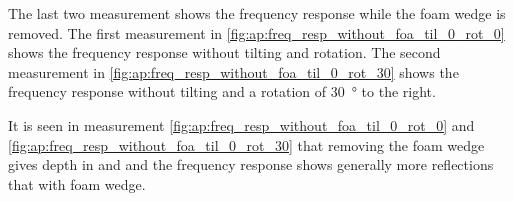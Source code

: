 The last two measurement shows the frequency response while the foam wedge is removed. The first measurement in \autoref{fig:ap:freq_resp_without_foa_til_0_rot_0} shows the frequency response without tilting and rotation. The second measurement in \autoref{fig:ap:freq_resp_without_foa_til_0_rot_30} shows the frequency response without tilting and a rotation of \SI{30}{\degree} to the right.



It is seen in measurement \autoref{fig:ap:freq_resp_without_foa_til_0_rot_0} and \autoref{fig:ap:freq_resp_without_foa_til_0_rot_30} that removing the foam wedge gives depth in  and  and the frequency response shows generally more reflections that with foam wedge.







